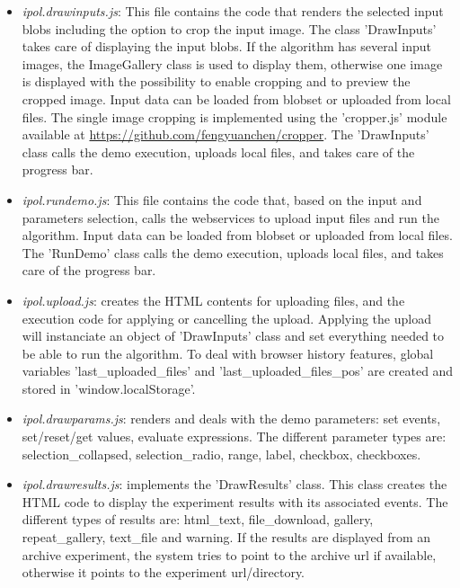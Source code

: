 \begin{itemize}
 \item \emph{ipol.drawinputs.js}: This file contains the code that renders 
  the selected input blobs including the option to crop the input image. The class
  'DrawInputs' takes care of displaying the input blobs.
  If the algorithm has several input images, the ImageGallery class is used
  to display them, otherwise one image is displayed with the possibility to 
  enable cropping and to preview the cropped image. Input data can be loaded
  from blobset or uploaded from local files. The single image cropping is
  implemented using the 'cropper.js' module available at 
  \url{https://github.com/fengyuanchen/cropper}. The 'DrawInputs' class
  calls the demo execution, uploads local files, and takes care of the progress bar.

 \item \emph{ipol.rundemo.js}: This file contains the code that, based on the 
  input and parameters selection, calls the webservices to upload input files
  and run the algorithm. Input data can be loaded
  from blobset or uploaded from local files. The 'RunDemo' class
  calls the demo execution, uploads local files, and takes care of the progress bar.

 \item \emph{ipol.upload.js}: creates the HTML contents for uploading
  files, and the execution code for applying or cancelling the upload. Applying 
  the upload will instanciate an object of 'DrawInputs' class and set everything
  needed to be able to run the algorithm. To deal with browser history features,
  global variables 'last\_uploaded\_files' and 'last\-\_up\-loaded\-\_files\-\_pos' are created
  and stored in 'window.localStorage'.

 \item \emph{ipol.drawparams.js}: renders and deals with the demo parameters:
  set events, set/reset/get values, evaluate expressions. The different parameter
  types are: selection\_collapsed,  selection\_radio,  range,  label,  checkbox,  
  checkboxes.


 \item \emph{ipol.drawresults.js}: implements the 'DrawResults' class. This
  class creates the HTML code to display the experiment results with its associated
  events. The different types of results are: html\_text, file\_download,
  gallery, repeat\_gallery, text\_file and warning. If the results are displayed
  from an archive experiment, the system tries to point to the archive url if
  available, otherwise it points to the experiment url/directory.



\end{itemize}
